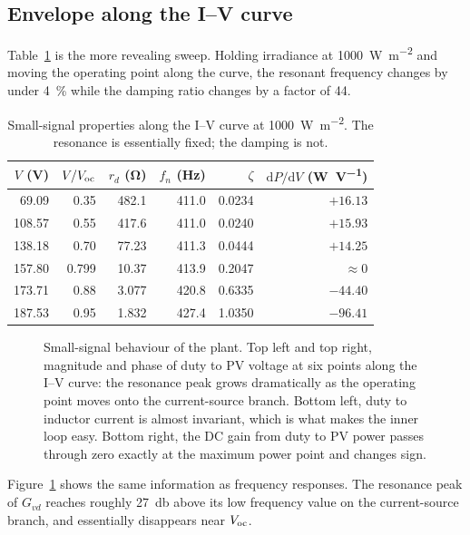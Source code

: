 \subsection{Envelope along the I--V curve}

Table~\ref{tab:envV} is the more revealing sweep. Holding irradiance at
\SI{1000}{\watt\per\square\metre} and moving the operating point along the
curve, the resonant frequency changes by under \SI{4}{\percent} while the
damping ratio changes by a factor of \num{44}.

\begin{table}[htbp]
\centering
\caption{Small-signal properties along the I--V curve at \SI{1000}{\watt\per\square\metre}. The resonance is essentially fixed; the damping is not.}
\label{tab:envV}
\begin{tabular}{@{}rrrrrr@{}}
\toprule
$V$ (\si{\volt}) & $V/V_{\mathrm{oc}}$ & $r_d$ (\si{\ohm}) & $f_n$ (\si{\hertz}) & $\zeta$ & $\mathrm{d}P/\mathrm{d}V$ (\si{\watt\per\volt}) \\
\midrule
69.09  & 0.35 & 482.1 & 411.0 & 0.0234 & $+16.13$ \\
108.57 & 0.55 & 417.6 & 411.0 & 0.0240 & $+15.93$ \\
138.18 & 0.70 & 77.23 & 411.3 & 0.0444 & $+14.25$ \\
157.80 & 0.799 & 10.37 & 413.9 & 0.2047 & $\approx 0$ \\
173.71 & 0.88 & 3.077 & 420.8 & 0.6335 & $-44.40$ \\
187.53 & 0.95 & 1.832 & 427.4 & 1.0350 & $-96.41$ \\
\bottomrule
\end{tabular}
\end{table}

\begin{figure}[htbp]
\centering
{}
\caption[Small-signal plant frequency response]{Small-signal behaviour of the plant. Top left and top right, magnitude and phase of duty to PV voltage at six points along the I--V curve: the resonance peak grows dramatically as the operating point moves onto the current-source branch. Bottom left, duty to inductor current is almost invariant, which is what makes the inner loop easy. Bottom right, the DC gain from duty to PV power passes through zero exactly at the maximum power point and changes sign.}
\label{fig:plantbode}
\end{figure}

Figure~\ref{fig:plantbode} shows the same information as frequency responses.
The resonance peak of $G_{vd}$ reaches roughly \SI{27}{\decibel} above its low
frequency value on the current-source branch, and essentially disappears near
$V_{\mathrm{oc}}$.


